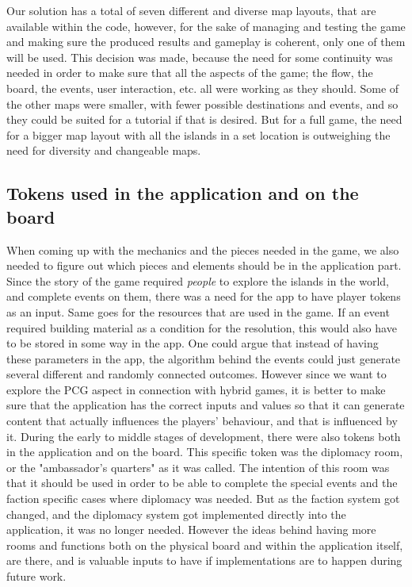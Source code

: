 Our solution has a total of seven different and diverse map layouts, that are available within the code, however, for the sake of managing and testing the game and making sure the produced results and gameplay is coherent, only one of them will be used. This decision was made, because the need for some continuity was needed in order to make sure that all the aspects of the game; the flow, the board, the events, user interaction, etc. all were working as they should. Some of the other maps were smaller, with fewer possible destinations and events, and so they could be suited for a tutorial if that is desired. But for a full game, the need for a bigger map layout with all the islands in a set location is outweighing the need for diversity and changeable maps.


\subsection{Tokens used in the application and on the board}
When coming up with the mechanics and the pieces needed in the game, we also needed to figure out which pieces and elements should be in the application part. Since the story of the game required \textit{people} to explore the islands in the world, and complete events on them, there was a need for the app to have player tokens as an input. Same goes for the resources that are used in the game. If an event required building material as a condition for the resolution, this would also have to be stored in some way in the app. One could argue that instead of having these parameters in the app, the algorithm behind the events could just generate several different and randomly connected outcomes. However since we want to explore the PCG aspect in connection with hybrid games, it is better to make sure that the application has the correct inputs and values so that it can generate content that actually influences the players' behaviour, and that is influenced by it.
During the early to middle stages of development, there were also tokens both in the application and on the board. This specific token was the diplomacy  room, or the "ambassador's quarters" as it was called. The intention of this room was that it should be used in order to be able to complete the special events and the faction specific cases where diplomacy was needed. But as the faction system got changed, and the diplomacy system got implemented directly into the application, it was no longer needed. However the ideas behind having more rooms and functions both on the physical board and within the application itself, are there, and is valuable inputs to have if implementations are to happen during future work.


